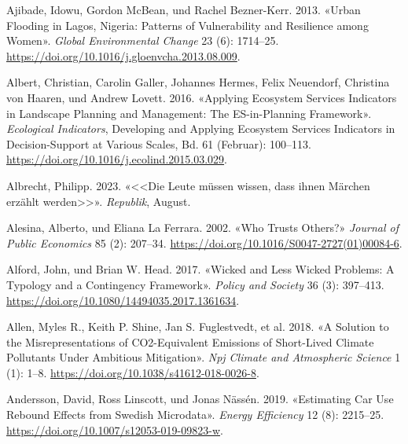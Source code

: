 \documentclass[
  nswissgerman,
  a4paper,
  DIV=11,
  numbers=noendperiod,
  oneside,
  openany]{scrreprt}
\newlength{\cslhangindent}
\newenvironment{CSLReferences}[2] %
 {\begin{list}{}{%
  \setlength{\itemindent}{0pt}
  \setlength{\leftmargin}{0pt}
  \setlength{\parsep}{0pt}
  \ifodd #1
   \setlength{\leftmargin}{\cslhangindent}
   \setlength{\itemindent}{-1\cslhangindent}
  \fi
  \setlength{\itemsep}{#2\baselineskip}}}
 {\end{list}}
\begin{document}
\protect{}\label{refs}
\begin{CSLReferences}{1}{1}
Ajibade, Idowu, Gordon McBean, und Rachel Bezner-Kerr. 2013. {«Urban
Flooding in {Lagos}, {Nigeria}: {Patterns} of Vulnerability and
Resilience among Women»}. \emph{Global Environmental Change} 23 (6):
1714--25. \url{https://doi.org/10.1016/j.gloenvcha.2013.08.009}.

{Albert, Christian, Carolin Galler, Johannes Hermes, Felix Neuendorf,
Christina von Haaren, und Andrew Lovett}. 2016. {«Applying Ecosystem
Services Indicators in Landscape Planning and Management: {The
ES-in-Planning} Framework»}. \emph{Ecological Indicators}, Developing
and {Applying Ecosystem Services Indicators} in {Decision-Support} at
{Various Scales}, Bd. 61 (Februar): 100--113.
\url{https://doi.org/10.1016/j.ecolind.2015.03.029}.

Albrecht, Philipp. 2023. {«{\textless\textless Die Leute m{ü}ssen
wissen, dass ihnen M{ä}rchen erz{ä}hlt
werden\textgreater\textgreater{}}»}. \emph{Republik}, August.

Alesina, Alberto, und Eliana La Ferrara. 2002. {«Who Trusts Others?»}
\emph{Journal of Public Economics} 85 (2): 207--34.
\url{https://doi.org/10.1016/S0047-2727(01)00084-6}.

Alford, John, und Brian W. Head. 2017. {«Wicked and Less Wicked
Problems: A Typology and a Contingency Framework»}. \emph{Policy and
Society} 36 (3): 397--413.
\url{https://doi.org/10.1080/14494035.2017.1361634}.

Allen, Myles R., Keith P. Shine, Jan S. Fuglestvedt, et al. 2018. {«A
Solution to the Misrepresentations of {CO2-Equivalent} Emissions of
Short-Lived Climate Pollutants Under Ambitious Mitigation»}. \emph{Npj
Climate and Atmospheric Science} 1 (1): 1--8.
\url{https://doi.org/10.1038/s41612-018-0026-8}.

Andersson, David, Ross Linscott, und Jonas Nässén. 2019. {«Estimating
Car Use Rebound Effects from {Swedish} Microdata»}. \emph{Energy
Efficiency} 12 (8): 2215--25.
\url{https://doi.org/10.1007/s12053-019-09823-w}.


\end{CSLReferences}
\end{document}
